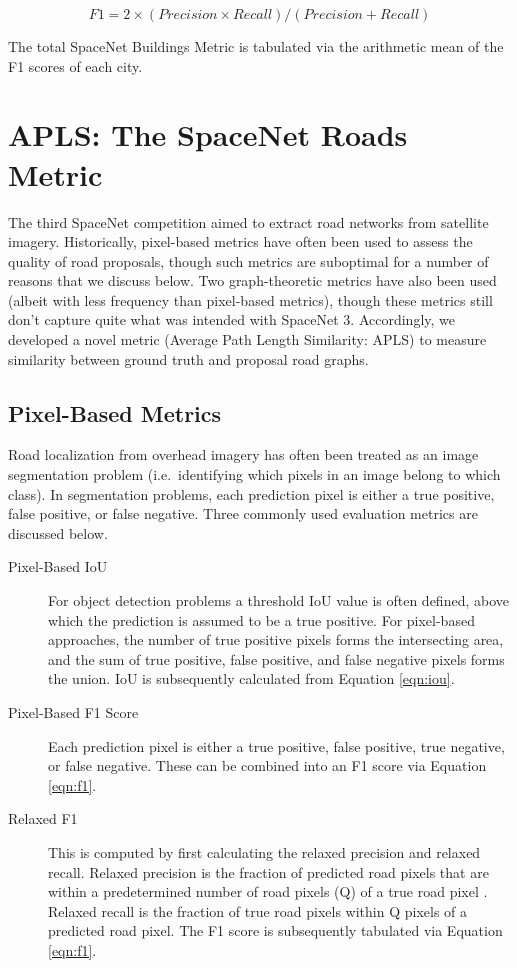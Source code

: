 \documentclass{article}
\begin{document}
\begin{equation}
\label{eqn:f1}
F1 = 2 \times (Precision \times Recall) / (Precision + Recall) 
\end{equation}

The total SpaceNet Buildings Metric is tabulated via the arithmetic mean of the F1 scores of each city. 


\section{APLS: The SpaceNet Roads Metric}

The third SpaceNet competition aimed to extract road networks from satellite imagery.  Historically, pixel-based metrics have often been used to assess the quality of road proposals, though such metrics are suboptimal for a number of reasons that we discuss below.  Two graph-theoretic metrics have also been used (albeit with less frequency than pixel-based metrics), though these metrics still don't capture quite what was intended with SpaceNet 3.  Accordingly, we developed a novel metric (Average Path Length Similarity: APLS) \cite{apls} to measure similarity between ground truth and proposal road graphs. 

\subsection{Pixel-Based Metrics}

Road localization from overhead imagery has often been treated as an image segmentation problem (i.e.~identifying which pixels in an image belong to which class).  In segmentation problems, each prediction pixel is either a true positive,
false positive,
or false negative.
Three commonly used evaluation metrics are discussed below.

\begin{description}

\item[Pixel-Based IoU]


For object detection problems a threshold IoU value is often defined, above which the prediction is assumed to be a true positive.  For pixel-based approaches, the number of true positive pixels forms the intersecting area, and the sum of true positive, false positive, and false negative pixels forms the union.  IoU is subsequently calculated from Equation \ref{eqn:iou}.

\item[Pixel-Based F1 Score]
Each prediction pixel is either a true positive, false positive, true negative, or false negative. These can be combined into an F1 score via Equation \ref{eqn:f1}.  

\item[Relaxed F1]
This is computed by first calculating the relaxed precision and relaxed recall.  Relaxed precision is the fraction of predicted road pixels that are within a predetermined number of road pixels (Q) of a true road pixel \cite{relaxedf1}.  Relaxed recall is the fraction of true road pixels within Q pixels of a predicted road pixel.  The F1 score is subsequently tabulated via Equation  \ref{eqn:f1}.


\end{description}
\end{document}
